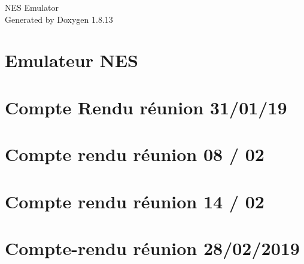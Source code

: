 \documentclass[twoside]{book}
\newcommand{\+}{\discretionary{\mbox{\scriptsize$\hookleftarrow$}}{}{}}
\newcommand{\clearemptydoublepage}{%
  \newpage{\pagestyle{empty}\cleardoublepage}%
}
\begin{document}
\hypersetup{pageanchor=false,
             bookmarksnumbered=true,
             pdfencoding=unicode
            }
\begin{titlepage}
\vspace*{7cm}
\begin{center}%
{\Large N\+ES Emulator }\\
\vspace*{1cm}
{\large Generated by Doxygen 1.8.13}\\
\end{center}
\end{titlepage}
\clearemptydoublepage
{}
\tableofcontents
\clearemptydoublepage
{}
\hypersetup{pageanchor=true}

\chapter{Emulateur N\+ES}
\label{md_gestion-de-projet_cdcf_cahier-des-charges}

\chapter{Compte Rendu réunion 31/01/19}
\label{md_gestion-de-projet_reunions_cr-reunion-01-31-19}

\chapter{Compte rendu réunion 08 / 02}
\label{md_gestion-de-projet_reunions_cr-reunion-02-08-19}

\chapter{Compte rendu réunion 14 / 02}
\label{md_gestion-de-projet_reunions_cr-reunion-02-14-19}

\chapter{Compte-\/rendu réunion 28/02/2019}
\label{md_gestion-de-projet_reunions_cr-reunion-02-28-2019}

\end{document}
